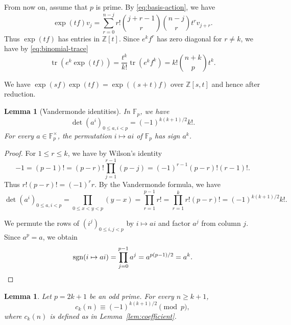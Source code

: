 \documentclass[12pt]{article}
\newtheorem{lemma}[theorem]{Lemma}
\theoremstyle{definition}
\theoremstyle{remark}
\DeclareMathOperator{\tr}{tr}
\DeclareMathOperator{\sgn}{sgn}
\newcommand{\Z}{\mathbb Z}
\newcommand{\Fp}{\mathbb F_p}
\begin{document}
From now on, assume that $p$ is prime. By \eqref{eq:basis-action}, we have
\[
 \exp(tf)v_j=\sum_{r=0}^{n-j}r!\binom{j+r-1}{r}\binom{n-j}{r}
 t^rv_{j+r}.
\]
Thus $\exp(tf)$ has entries in $\Z[t]$. Since $e^kf^r$ has zero
diagonal for $r\neq k$, we have by \eqref{eq:binomial-trace}
\begin{equation}\label{eq:exponential-trace}
 \tr(e^k\exp(tf))=\frac{t^k}{k!}\tr(e^kf^k)
 =k!\binom{n+k}{p}t^k.
\end{equation}

We have $\exp(sf)\exp(tf)=\exp((s+t)f)$ over $\Z[s,t]$
and hence after reduction.

\begin{lemma}[Vandermonde identities]\label{lem:vandermonde}
In $\Fp$, we have
\[
 \det(a^i)_{0\leq a,i<p}=(-1)^{k(k+1)/2}k!.
\]
For every $a\in\Fp^\times$, the permutation $i\mapsto ai$ of $\Fp$
has sign $a^k$.
\end{lemma}

\begin{proof}
For $1\leq r\leq k$, we have by Wilson's identity
\[
 -1=(p-1)!=(p-r)!\prod_{j=1}^{r-1}(p-j)
 =(-1)^{r-1}(p-r)!(r-1)!.
\]
Thus $r!(p-r)!=(-1)^r r$. By the Vandermonde formula, we have
\[
 \det(a^i)_{0\leq a,i<p}
 =\prod_{0\leq x<y<p}(y-x)
 =\prod_{r=1}^{p-1}r!
 =\prod_{r=1}^{k}r!(p-r)!
 =(-1)^{k(k+1)/2}k!.
\]

We permute the rows of $(i^j)_{0\leq i,j<p}$ by $i\mapsto ai$
and factor $a^j$ from column $j$. Since $a^p=a$, we obtain
\[
 \sgn(i\mapsto ai)=\prod_{j=0}^{p-1}a^j
 =a^{p(p-1)/2}=a^k.\qedhere
\]
\end{proof}

\begin{lemma}\label{lem:coefficient-congruence}
Let $p=2k+1$ be an odd prime. For every $n\geq k+1$,
\begin{equation}\label{eq:coefficient-congruence}
 c_k(n)\equiv(-1)^{k(k+1)/2}\pmod p,
\end{equation}
where $c_k(n)$ is defined as in Lemma~\ref{lem:coefficient}.
\end{lemma}
\end{document}
